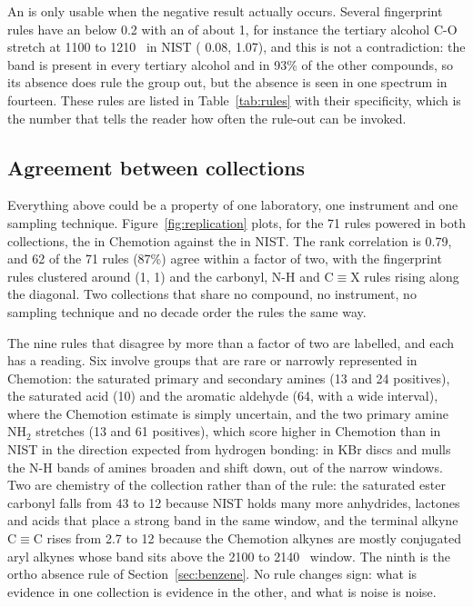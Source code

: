 An \LRn{} is only usable when the negative result actually occurs. Several fingerprint rules have an \LRn{} below 0.2 with an \LRp{} of about 1, for instance the tertiary alcohol C-O stretch at 1100 to 1210~\wn{} in NIST (\LRn{} 0.08, \LRp{} 1.07), and this is not a contradiction: the band is present in every tertiary alcohol and in 93\% of the other compounds, so its absence does rule the group out, but the absence is seen in one spectrum in fourteen. These rules are listed in Table~\ref{tab:rules} with their specificity, which is the number that tells the reader how often the rule-out can be invoked.

\subsection{Agreement between collections}
\label{sec:replication}

Everything above could be a property of one laboratory, one instrument and one sampling technique. Figure~\ref{fig:replication} plots, for the 71 rules powered in both collections, the \LRp{} in Chemotion against the \LRp{} in NIST. The rank correlation is 0.79, and 62 of the 71 rules (87\%) agree within a factor of two, with the fingerprint rules clustered around (1, 1) and the carbonyl, N-H and C$\equiv$X rules rising along the diagonal. Two collections that share no compound, no instrument, no sampling technique and no decade order the rules the same way.

The nine rules that disagree by more than a factor of two are labelled, and each has a reading. Six involve groups that are rare or narrowly represented in Chemotion: the saturated primary and secondary amines (13 and 24 positives), the saturated acid (10) and the aromatic aldehyde (64, with a wide interval), where the Chemotion estimate is simply uncertain, and the two primary amine NH$_2$ stretches (13 and 61 positives), which score higher in Chemotion than in NIST in the direction expected from hydrogen bonding: in KBr discs and mulls the N-H bands of amines broaden and shift down, out of the narrow windows. Two are chemistry of the collection rather than of the rule: the saturated ester carbonyl falls from 43 to 12 because NIST holds many more anhydrides, lactones and acids that place a strong band in the same window, and the terminal alkyne C$\equiv$C rises from 2.7 to 12 because the Chemotion alkynes are mostly conjugated aryl alkynes whose band sits above the 2100 to 2140~\wn{} window. The ninth is the ortho absence rule of Section~\ref{sec:benzene}. No rule changes sign: what is evidence in one collection is evidence in the other, and what is noise is noise.

